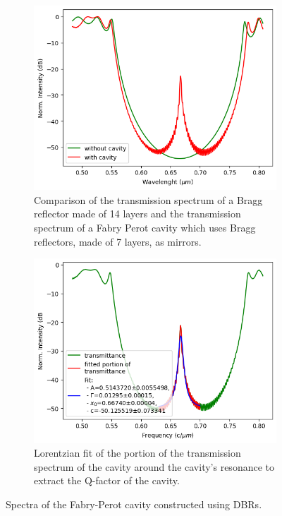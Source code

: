 \begin{figure}[H]
    \centering
    \begin{subfigure}[b]{0.45\linewidth}
        \centering
        \includegraphics[width=\linewidth]{Figures/bragg_vs_cavity_spectrum.png}
        \caption{Comparison of the transmission spectrum of a Bragg reflector made of 14 layers and the transmission spectrum of a Fabry Perot cavity which uses Bragg reflectors, made of 7 layers, as mirrors.}
        \label{fig:bragg_vs_cavity_spectrum}
    \end{subfigure}
    \hfill
    \begin{subfigure}[b]{0.45\linewidth}
        \centering
        \includegraphics[width=\linewidth]{Figures/bragg_cavity_spectrum_fit.png}
        \caption{Lorentzian fit of the portion of the transmission spectrum of the cavity around the cavity's resonance to extract the Q-factor of the cavity.}
        \label{fig:bragg_cavity_spectrum_fit}
    \end{subfigure}
    \caption{Spectra of the Fabry-Perot cavity constructed using DBRs.}
\end{figure}

